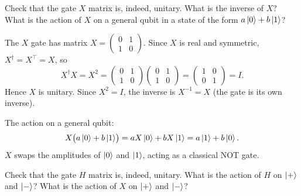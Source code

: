\documentclass{ceri/sty/rapport}
\newcounter{exercice}[section]
\begin{document}
\begin{exercice}[p.~15]
Check that the gate $X$ matrix is, indeed, unitary.
What is the inverse of $X$?
What is the action of $X$ on a general qubit in a state of the form
$a\ket{0} + b\ket{1}$?
\end{exercice}

\begin{solution}
The $X$ gate has matrix $X=\begin{pmatrix}0&1\\1&0\end{pmatrix}$.
Since $X$ is real and symmetric, $X^\dagger = X^\top = X$, so
\[
  X^\dagger X = X^2 =
  \begin{pmatrix}0&1\\1&0\end{pmatrix}
  \begin{pmatrix}0&1\\1&0\end{pmatrix}
  = \begin{pmatrix}1&0\\0&1\end{pmatrix} = I.
\]
Hence $X$ is unitary.  Since $X^2=I$, the inverse is $X^{-1}=X$ (the gate is its own inverse).

The action on a general qubit:
\[
  X\bigl(a\ket{0}+b\ket{1}\bigr) = aX\ket{0}+bX\ket{1} = a\ket{1}+b\ket{0}.
\]
$X$ swaps the amplitudes of $\ket{0}$ and $\ket{1}$, acting as a classical NOT gate.
\end{solution}

\begin{exercice}[p.~16]
Check that the gate $H$ matrix is, indeed, unitary.
What is the action of $H$ on $\ket{+}$ and $\ket{-}$?
What is the action of $X$ on $\ket{+}$ and $\ket{-}$?
\end{exercice}
\end{document}
